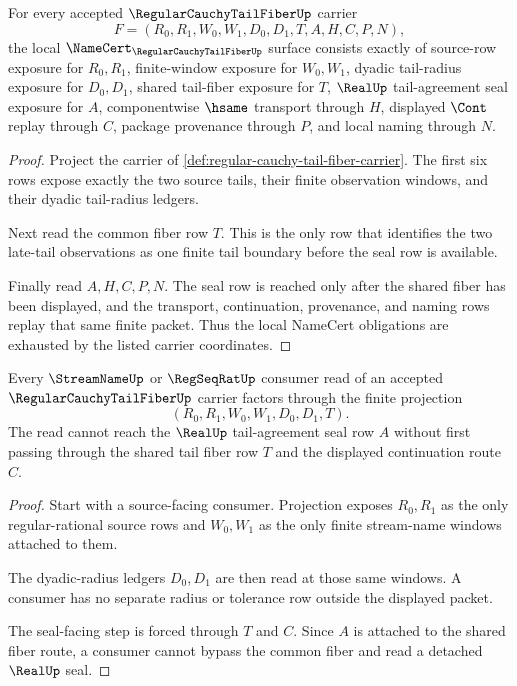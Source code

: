\begin{theorem}
\label{thm:regular-cauchy-tail-fiber-namecert-obligations}
For every accepted $\RegularCauchyTailFiberUp$ carrier
$$
F=(R_0,R_1,W_0,W_1,D_0,D_1,T,A,H,C,P,N),
$$
the local $\NameCert_{\RegularCauchyTailFiberUp}$ surface consists exactly of source-row exposure for $R_0,R_1$, finite-window exposure for $W_0,W_1$, dyadic tail-radius exposure for $D_0,D_1$, shared tail-fiber exposure for $T$, $\RealUp$ tail-agreement seal exposure for $A$, componentwise $\hsame$ transport through $H$, displayed $\Cont$ replay through $C$, package provenance through $P$, and local naming through $N$.
\end{theorem}
\begin{proof}
Project the carrier of \autoref{def:regular-cauchy-tail-fiber-carrier}. The first six rows expose exactly the two source tails, their finite observation windows, and their dyadic tail-radius ledgers.

Next read the common fiber row $T$. This is the only row that identifies the two late-tail observations as one finite tail boundary before the seal row is available.

Finally read $A,H,C,P,N$. The seal row is reached only after the shared fiber has been displayed, and the transport, continuation, provenance, and naming rows replay that same finite packet. Thus the local NameCert obligations are exhausted by the listed carrier coordinates.
\end{proof}

\begin{theorem}
\label{thm:regular-cauchy-tail-fiber-window-projection}
Every $\StreamNameUp$ or $\RegSeqRatUp$ consumer read of an accepted $\RegularCauchyTailFiberUp$ carrier factors through the finite projection
$$
(R_0,R_1,W_0,W_1,D_0,D_1,T).
$$
The read cannot reach the $\RealUp$ tail-agreement seal row $A$ without first passing through the shared tail fiber row $T$ and the displayed continuation route $C$.
\end{theorem}
\begin{proof}
Start with a source-facing consumer. Projection exposes $R_0,R_1$ as the only regular-rational source rows and $W_0,W_1$ as the only finite stream-name windows attached to them.

The dyadic-radius ledgers $D_0,D_1$ are then read at those same windows. A consumer has no separate radius or tolerance row outside the displayed packet.

The seal-facing step is forced through $T$ and $C$. Since $A$ is attached to the shared fiber route, a consumer cannot bypass the common fiber and read a detached $\RealUp$ seal.
\end{proof}

